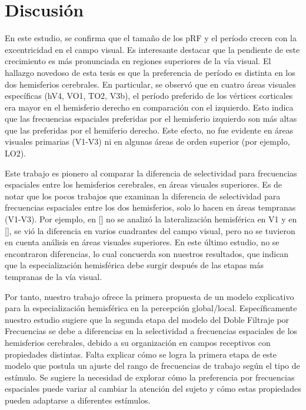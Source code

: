 \chapter{Discusi\'on}\label{chapter:discussion}

En este estudio, se confirma que el tamaño de los pRF y el período crecen con la excentricidad en el campo visual. Es interesante destacar que la pendiente de este crecimiento es más pronunciada en regiones superiores de la vía visual. El hallazgo novedoso de esta tesis es que la preferencia de per\'iodo es distinta en los dos hemisferios cerebrales. En particular, se observó que en cuatro áreas visuales específicas (hV4, VO1, TO2, V3b), el período preferido de los vértices corticales era mayor en el hemisferio derecho en comparación con el izquierdo. Esto indica que las frecuencias espaciales preferidas por el hemisferio izquierdo son m\'as altas que las preferidas por el hemiferio derecho. Este efecto, no fue evidente en áreas visuales primarias (V1-V3) ni en algunas áreas de orden superior (por ejemplo, LO2).

Este trabajo es pionero al comparar la diferencia de selectividad para frecuencias espaciales entre los hemisferios cerebrales, en áreas visuales superiores. Es de notar que los pocos trabajos que examinan la diferencia de selectividad para frecuencias espaciales entre los dos hemisferios, solo lo hacen en áreas tempranas (V1-V3). Por ejemplo, en [\cite{broderick_mapping_2022}] no se analiz\'o la lateralizaci\'on hemisf\'erica en V1 y en [\cite{aghajari_population_2020}], se vi\'o la diferencia en varios cuadrantes del campo visual, pero  no se tuvieron en cuenta an\'alisis en \'areas visuales superiores. En este \'ultimo estudio, no se encontraron diferencias, lo cual concuerda son nuestros resultados, que indican que la especialización hemisf\'erica debe surgir después de las etapas más tempranas de la vía visual. 

Por tanto, nuestro trabajo ofrece la primera propuesta de un modelo explicativo para la especialización hemisférica en la percepción global/local. Específicamente nuestro estudio sugiere que la segunda etapa del modelo del Doble Filtraje por Frecuencias se debe a diferencias en la selectividad a frecuencias espaciales de los hemisferios cerebrales, debido a su organización en campos receptivos con propiedades distintas.  Falta explicar cómo se logra la primera etapa de este modelo que postula un ajuste del rango de frecuencias de trabajo según el tipo de estímulo. Se sugiere la necesidad de explorar cómo la preferencia por frecuencias espaciales puede variar al cambiar la atención del sujeto y cómo estas propiedades pueden adaptarse a diferentes estímulos.

